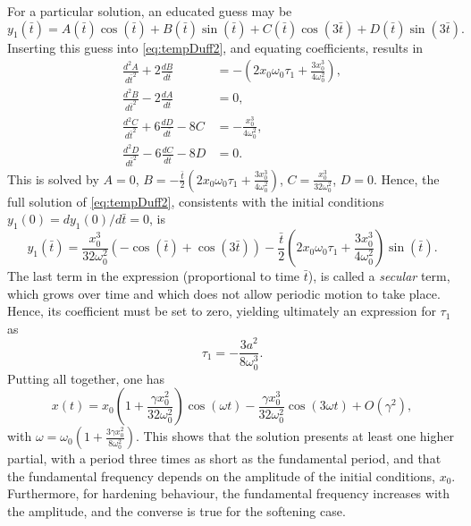 \documentclass[11pt,twoside,a4paper,english]{book}
\begin{document}
For a particular solution, an educated guess may be
\begin{equation}
y_1(\bar t) = A(\bar t) \cos(\bar t) + B(\bar t) \sin(\bar t) + C(\bar t) \cos(3 \bar t) + D(\bar t) \sin(3 \bar t).
\end{equation} 
Inserting this guess into \eqref{eq:tempDuff2}, and equating coefficients, results in
\begin{subequations}
\begin{align}
\frac{d^2 A}{d\bar t^2} + 2 \frac{d B}{d\bar t} &= - \left(2x_0\omega_0\tau_1 + \frac{3 x_0^3}{4\omega_0^2}\right), \\
\frac{d^2 B}{d\bar t^2} - 2 \frac{d A}{d\bar t} &= 0, \\
\frac{d^2 C}{d\bar t^2} + 6 \frac{d D}{d\bar t} - 8 C &= -\frac{x_0^3}{4\omega_0^2}, \\
\frac{d^2 D}{d\bar t^2} - 6 \frac{d C}{d\bar t} - 8 D &= 0.
\end{align}
\end{subequations}
This is solved by $A = 0$, $B = -\frac{\bar t}{2}\left( 2x_0\omega_0\tau_1 + \frac{3 x_0^3}{4\omega_0^2}\right )$, $C = \frac{x_0^3}{32\omega_0^2}$, $D=0$. Hence, the full solution of \eqref{eq:tempDuff2}, consistents with the initial conditions $y_1(0) = dy_1(0)/d\bar t=0$, is
\begin{equation}
y_1(\bar t) = \frac{x_0^3}{32\omega_0^2}\left(-\cos(\bar t) + \cos(3 \bar t) \right) - \frac{\bar t}{2}\left(2x_0\omega_0\tau_1 + \frac{3x_0^3}{4\omega_0^2} \right)\sin(\bar t).
\end{equation}
The last term in the expression (proportional to time $\bar t$), is called a \emph{secular} term, which grows over time and which does not allow periodic motion to take place. Hence, its coefficient must be set to zero, yielding ultimately an expression for $\tau_1$ as
\begin{equation}
\tau_1 = -\frac{3a^2}{8\omega_0^3}. 
\end{equation}
Putting all together, one has
\begin{equation}\label{eq:LinPoinSol}
x(t) = x_0\left(1 + \frac{\gamma x_0^2}{32\omega_0^2} \right) \cos(\omega t) - \frac{\gamma x_0^3}{32 \omega_0^2}\cos(3\omega t) + O(\gamma^2), 
\end{equation}
with $\omega = \omega_0\left(1 + \frac{3\gamma x_0^2}{8 \omega_0^2}\right)$. This shows that the solution presents at least one higher partial, with a period three times as short as the fundamental period, and that the fundamental frequency depends on the amplitude of the initial conditions, $x_0$. Furthermore, for hardening behaviour, the fundamental frequency increases with the amplitude, and the converse is true for the softening case.
\end{document}
